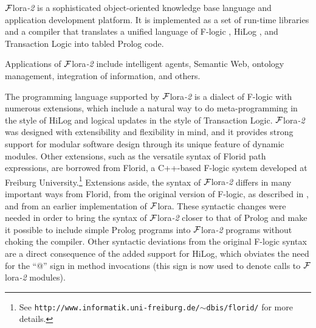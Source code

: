 


\newcommand{\FLIP}{{\mbox{\sc Flip}}\xspace}
\newcommand{\FLORA}{{\mbox{${\cal F}${\sc lora}\rm\emph{-2}}}\xspace}
\newcommand{\FLORAone}{{\mbox{${\cal F}${\sc lora}}}\xspace}
\newcommand{\FLORID}{{\mbox{\sc Florid}}\xspace}
\newcommand{\fl}{\mbox{F-logic}\xspace}






\FLORA is a sophisticated object-oriented knowledge base language and
application development platform. It is implemented as a set of run-time
libraries and a compiler that translates a unified language of \fl
\cite{KLW95}, HiLog \cite{hilog-jlp}, and Transaction Logic
\cite{trans-chapter-98,trans-tcs94} into tabled Prolog code.

Applications of \FLORA include intelligent agents, Semantic Web, ontology
management, integration of information, and others. 

The programming language supported by \FLORA is a dialect of \fl with
numerous extensions, which include a natural way to do meta-programming in
the style of HiLog and logical updates in the style of Transaction
Logic. \FLORA was designed with extensibility and flexibility in mind, and
it provides strong support for modular software design through its unique
feature of dynamic modules.
Other extensions, such as the versatile syntax of \FLORID path
expressions, are borrowed from
\FLORID, a C++-based \fl system developed at
Freiburg University.\footnote{
  See {\tt http://www.informatik.uni-freiburg.de/$\sim$dbis/florid/} for more
  details.
}
Extensions aside, the syntax of \FLORA differs in many
important ways from \FLORID, from the original version of \fl, as described
in \cite{KLW95}, and from an earlier implementation of \FLORAone. These
syntactic changes were needed in order to bring the syntax of \FLORA closer
to that of Prolog and make it possible to include simple Prolog programs
into \FLORA programs without choking the compiler.  Other syntactic
deviations from the original F-logic syntax are a direct consequence of the
added support for HiLog, which obviates the need for the ``@'' sign in
method invocations (this sign is now used to denote calls to \FLORA
modules).

